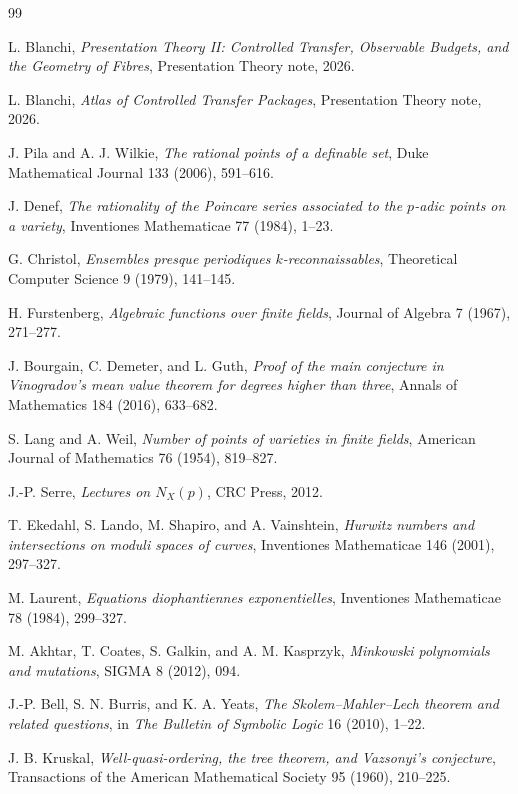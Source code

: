 \documentclass[11pt]{article}
\begin{document}
\begin{thebibliography}{99}

L. Blanchi,
\emph{Presentation Theory II: Controlled Transfer, Observable Budgets, and the Geometry of Fibres},
Presentation Theory note, 2026.

L. Blanchi,
\emph{Atlas of Controlled Transfer Packages},
Presentation Theory note, 2026.

J. Pila and A. J. Wilkie,
\emph{The rational points of a definable set},
Duke Mathematical Journal 133 (2006), 591--616.

J. Denef,
\emph{The rationality of the Poincare series associated to the \(p\)-adic points on a variety},
Inventiones Mathematicae 77 (1984), 1--23.

G. Christol,
\emph{Ensembles presque periodiques \(k\)-reconnaissables},
Theoretical Computer Science 9 (1979), 141--145.

H. Furstenberg,
\emph{Algebraic functions over finite fields},
Journal of Algebra 7 (1967), 271--277.

J. Bourgain, C. Demeter, and L. Guth,
\emph{Proof of the main conjecture in Vinogradov's mean value theorem for degrees higher than three},
Annals of Mathematics 184 (2016), 633--682.

S. Lang and A. Weil,
\emph{Number of points of varieties in finite fields},
American Journal of Mathematics 76 (1954), 819--827.

J.-P. Serre,
\emph{Lectures on \(N_X(p)\)},
CRC Press, 2012.

T. Ekedahl, S. Lando, M. Shapiro, and A. Vainshtein,
\emph{Hurwitz numbers and intersections on moduli spaces of curves},
Inventiones Mathematicae 146 (2001), 297--327.

M. Laurent,
\emph{Equations diophantiennes exponentielles},
Inventiones Mathematicae 78 (1984), 299--327.

M. Akhtar, T. Coates, S. Galkin, and A. M. Kasprzyk,
\emph{Minkowski polynomials and mutations},
SIGMA 8 (2012), 094.

J.-P. Bell, S. N. Burris, and K. A. Yeats,
\emph{The Skolem--Mahler--Lech theorem and related questions},
in \emph{The Bulletin of Symbolic Logic} 16 (2010), 1--22.

J. B. Kruskal,
\emph{Well-quasi-ordering, the tree theorem, and Vazsonyi's conjecture},
Transactions of the American Mathematical Society 95 (1960), 210--225.

\end{thebibliography}
\end{document}
